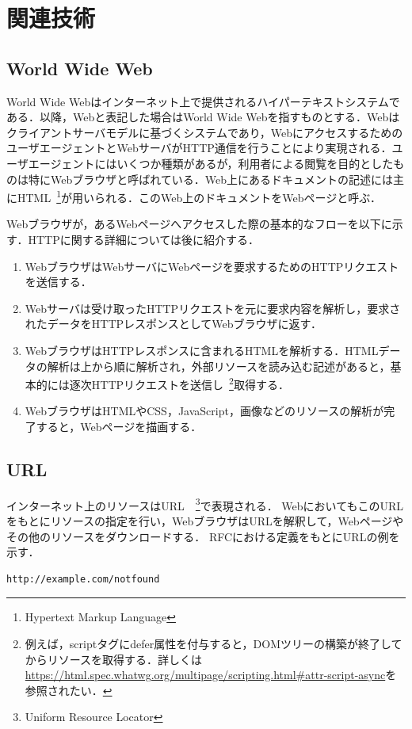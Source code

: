 \newpage
\section{関連技術}
\subsection{World Wide Web}
World Wide Webはインターネット上で提供されるハイパーテキストシステムである．以降，Webと表記した場合はWorld Wide Webを指すものとする．Webはクライアントサーバモデルに基づくシステムであり，WebにアクセスするためのユーザエージェントとWebサーバがHTTP通信を行うことにより実現される．ユーザエージェントにはいくつか種類があるが，利用者による閲覧を目的としたものは特にWebブラウザと呼ばれている．Web上にあるドキュメントの記述には主にHTML~\footnote{Hypertext Markup Language}が用いられる．このWeb上のドキュメントをWebページと呼ぶ．

Webブラウザが，あるWebページへアクセスした際の基本的なフローを以下に示す．HTTPに関する詳細については後に紹介する．

\begin{enumerate}
\item WebブラウザはWebサーバにWebページを要求するためのHTTPリクエストを送信する．
\item Webサーバは受け取ったHTTPリクエストを元に要求内容を解析し，要求されたデータをHTTPレスポンスとしてWebブラウザに返す．
\item WebブラウザはHTTPレスポンスに含まれるHTMLを解析する．HTMLデータの解析は上から順に解析され，外部リソースを読み込む記述があると，基本的には逐次HTTPリクエストを送信し~\footnote{例えば，scriptタグにdefer属性を付与すると，DOMツリーの構築が終了してからリソースを取得する．詳しくは\url{https://html.spec.whatwg.org/multipage/scripting.html\#attr-script-async}を参照されたい．}取得する．
\item WebブラウザはHTMLやCSS，JavaScript，画像などのリソースの解析が完了すると，Webページを描画する．
\end{enumerate}

\subsection{URL}
インターネット上のリソースはURL~\cite{rfc1738,rfc3986,url_ls}~\footnote{Uniform Resource Locator}で表現される．
WebにおいてもこのURLをもとにリソースの指定を行い，WebブラウザはURLを解釈して，Webページやその他のリソースをダウンロードする．
RFCにおける定義をもとにURLの例を示す．

\begin{verbatim}
http://example.com/notfound
\end{verbatim}

